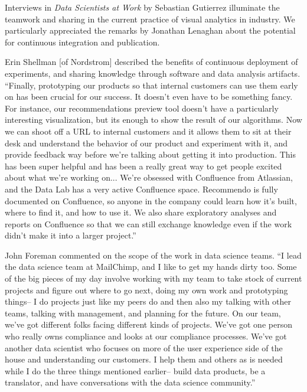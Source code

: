Interviews in {\it Data Scientists at Work} by Sebastian Gutierrez illuminate
the teamwork and sharing in the current practice of visual analytics in industry.
We particularly appreciated the remarks by Jonathan Lenaghan about the potential
for continuous integration and publication.

Erin Shellman [of Nordstrom] described the benefits of
continuous deployment of experiments, and sharing knowledge
through software and data analysis artifacts.
``Finally, prototyping our products so that internal
customers can use them early on has been crucial for
our success. It doesn't even have to be something
fancy. For instance, our recommendations preview
tool doesn't have a particularly interesting
visualization, but its enough to show the result of our
algorithms. Now we can shoot off a URL to internal
customers and it allows them to sit at their desk and
understand the behavior of our product and
experiment with it, and provide feedback way before
we're talking about getting it into production. This
has been super helpful and has been a really great
way to get people excited about what we're working
on...
%
We’re obsessed with Confluence from
Atlassian, and the Data Lab has a very active
Confluence space. Recommendo is fully documented
on Confluence, so anyone in the company could learn
how it’s built, where to find it, and how to use it.
We also share exploratory analyses and reports on
Confluence so that we can still exchange knowledge
even if the work didn’t make it into a larger project.''

John Foreman commented on the scope of the work in
data science teams.
``I lead the data science team at
MailChimp, and I like to get my hands dirty too.
Some of the big pieces of my day involve working
with my team to take stock of current projects and
figure out where to go next, doing my own work and
prototyping things-- I do projects just like my peers
do and then also my talking with other teams,
talking with management, and planning for the
future.
On our team, we’ve got different folks facing different
kinds of projects. We’ve got one person who really
owns compliance and looks at our compliance
processes. We’ve got another data scientist who
focuses on more of the user experience side of the
house and understanding our customers. I help them
and others as is needed while I do the three things
mentioned earlier-- build data products, be a
translator, and have conversations with the data
science community.''

